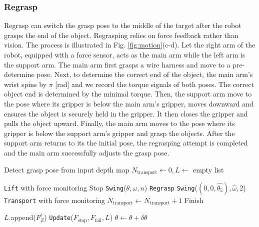 \documentclass[letterpaper, 10 pt, conference]{ieeeconf}
\newcommand{\green}[1]{\textcolor[rgb]{0.0, 0.69, 0.31}{#1}}
\begin{document}
\subsubsection{Regrasp}
    Regrasp can switch the grasp pose to the middle of the target after the robot grasps the end of the object. Regrasping relies on force feedback rather than vision. The process is illustrated in Fig. \ref{fig:motion}(c-d). Let the right arm of the robot, equipped with a force sensor, acts as the main arm while the left arm is the support arm. The main arm first grasps a wire harness and move to a pre-determine pose. Next, to determine the correct end of the object, the main arm's wrist spins by $\pi$ [rad] and we record the torque signals of both poses. The correct object end is determined by the minimal torque. Then, the support arm move to the pose where its gripper is below the main arm's gripper, moves downward and ensures the object is securely held in the gripper. It then closes the gripper and pulls the object upward. Finally, the main arm moves to the pose where its gripper is below the support arm's gripper and grasp the objects. After the support arm returns to its the initial pose, the regrasping attempt is completed and the main arm successfully adjusts the grasp pose. 


\begin{algorithm}[t]
    
    Detect grasp pose from input depth map\;
    $N_\text{transport} \gets 0, L \gets$ empty list\;
    {
        \texttt{Lift} with force monitoring\;
        {
            {Stop}\;
            \texttt{Swing}($\theta,\omega,n$)\;
        }
        {
            \texttt{Regrasp}\;
        }
        \texttt{Swing}($(0,0,\hat{\theta_5}),\hat{\omega},2$)\;
        \texttt{Transport} with force monitoring\;
        $N_\text{transport} \gets N_\text{transport}+1$\;
            {
                Finish\;
            }
        
        $L.$append($F_Z^t$)\;
        \texttt{Update}($F_\text{stop},F_\text{fail},L$)\;
        $\theta \gets \theta+\delta \theta$\;
    }
\caption{Workflow of A Picking Attempt}
\label{alg:system}
\end{algorithm}
\end{document}
